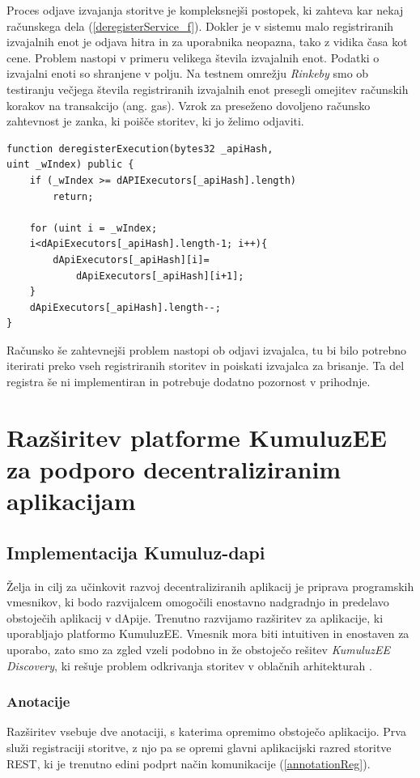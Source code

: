 \documentclass[a4paper, 12pt]{book}
\begin{document}
Proces odjave izvajanja storitve je kompleksnejši postopek, ki zahteva kar nekaj računskega dela (\ref{deregisterService_f}).
Dokler je v sistemu malo registriranih izvajalnih enot je odjava hitra in za uporabnika neopazna, tako z vidika časa kot cene.
Problem nastopi v primeru velikega števila izvajalnih enot.
Podatki o izvajalni enoti so shranjene v polju.
Na testnem omrežju \textit{Rinkeby} smo ob testiranju večjega števila registriranih izvajalnih enot presegli omejitev računskih korakov na transakcijo (ang. gas).
Vzrok za preseženo dovoljeno računsko zahtevnost je zanka, ki poišče storitev, ki jo želimo odjaviti.

\begin{lstlisting}[caption={Odjava izvajanja},captionpos=b,label={deregisterService_f}]
function deregisterExecution(bytes32 _apiHash, 
uint _wIndex) public {
	if (_wIndex >= dAPIExecutors[_apiHash].length)
		return;
	
	for (uint i = _wIndex;
	i<dApiExecutors[_apiHash].length-1; i++){
		dApiExecutors[_apiHash][i]=
			dApiExecutors[_apiHash][i+1];
	}
	dApiExecutors[_apiHash].length--;
}
\end{lstlisting}

Računsko še zahtevnejši problem nastopi ob odjavi izvajalca, tu bi bilo potrebno iterirati preko vseh registriranih storitev in poiskati izvajalca za brisanje.
Ta del registra še ni implementiran in potrebuje dodatno pozornost v prihodnje.


\section{Razširitev platforme KumuluzEE za podporo decentraliziranim aplikacijam}

\subsection{Implementacija Kumuluz-dapi}
Želja in cilj za učinkovit razvoj decentraliziranih aplikacij je priprava programskih vmesnikov, ki bodo razvijalcem omogočili enostavno nadgradnjo in predelavo obstoječih aplikacij v dApije.
Trenutno razvijamo razširitev za aplikacije, ki uporabljajo platformo KumuluzEE.
Vmesnik mora biti intuitiven in enostaven za uporabo, zato smo za zgled vzeli podobno in že obstoječo rešitev \textit{KumuluzEE Discovery}, ki rešuje problem odkrivanja storitev v oblačnih arhitekturah \cite{maldip}.

\subsubsection{Anotacije}
Razširitev vsebuje dve anotaciji, s katerima opremimo obstoječo aplikacijo.
Prva služi registraciji storitve, z njo pa se opremi glavni aplikacijski razred storitve REST, ki je trenutno edini podprt način komunikacije (\ref{annotationReg}).
\end{document}
